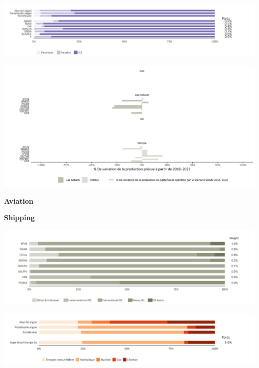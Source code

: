 \documentclass[10pt,table,a4]{article}\usepackage[]{graphicx}\usepackage[]{color}
\begin{document}
	\setlength\multicolsep{0pt}
	\vspace{0cm}
	
	\begin{multicols}{2}
		
		\includegraphics[width=.9\linewidth]{ReportOutputs/Fig41} \vfill\null \columnbreak
		
		\includegraphics[width=.9\linewidth]{ReportOutputs/Fig42}
		
	\end{multicols}
	
	\begin{multicols}{2}
		
		\textbf{Aviation}
		
		\textbf{Shipping}
		
	\end{multicols}
	
	\vspace{0cm}
	
	\begin{multicols}{2}
		
		\includegraphics[trim = {0 0 0 0pt}, width=.9\linewidth]{ReportOutputs/Fig43}  \vfill\null \columnbreak
		
		\includegraphics[width=1\linewidth]{ReportOutputs/Fig44}
		
	\end{multicols}
	
\end{document}
